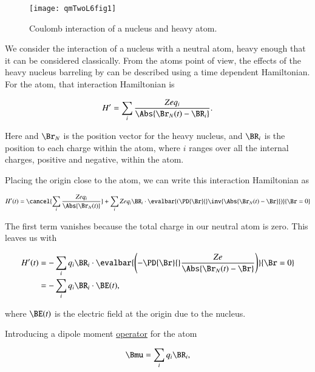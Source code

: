 \begin{figure}[htp]
\centering
\texttt{[image: qmTwoL6fig1]}
\caption{Coulomb interaction of a nucleus and heavy atom.}\label{fig:qmTwoL6:1}
\end{figure}

We consider the interaction of a nucleus with a neutral atom, heavy enough that it can be considered classically.  From the atoms point of view, the effects of the heavy nucleus barreling by can be described using a time dependent Hamiltonian.  For the atom, that interaction Hamiltonian is

\begin{equation}\label{eqn:qmTwoL6:10}
H' = \sum_i \frac{ Z e q_i }{\Abs{\Br_N(t) - \BR_i}}.
\end{equation}

Here and $\Br_N$ is the position vector for the heavy nucleus, and $\BR_i$ is the position to each charge within the atom, where $i$ ranges over all the internal charges, positive and negative, within the atom.

Placing the origin close to the atom, we can write this interaction Hamiltonian as

\begin{equation}\label{eqn:qmTwoL6:30}
H'(t) = \cancel{\sum_i \frac{Z e q_i}{\Abs{\Br_N(t)}}}
+ \sum_i Z e q_i \BR_i \cdot 
\evalbar{\left(
\PD{\Br}{} \inv{\Abs{ \Br_N(t) - \Br}}
\right)}{\Br = 0}
\end{equation}

The first term vanishes because the total charge in our neutral atom is zero.  This leaves us with

\begin{equation}\label{eqn:qmTwoL6:50}
\begin{aligned}
H'(t) 
&= 
-\sum_i q_i \BR_i \cdot \evalbar{\left(
-\PD{\Br}{} \frac{ Z e}{\Abs{ \Br_N(t) - \Br}}
\right)}{\Br = 0} \\
&= - \sum_i q_i \BR_i \cdot \BE(t),
\end{aligned}
\end{equation}

where $\BE(t)$ is the electric field at the origin due to the nucleus.

Introducing a dipole moment \underline{operator} for the atom

\begin{equation}\label{eqn:qmTwoL6:70}
\Bmu = \sum_i q_i \BR_i,
\end{equation}

